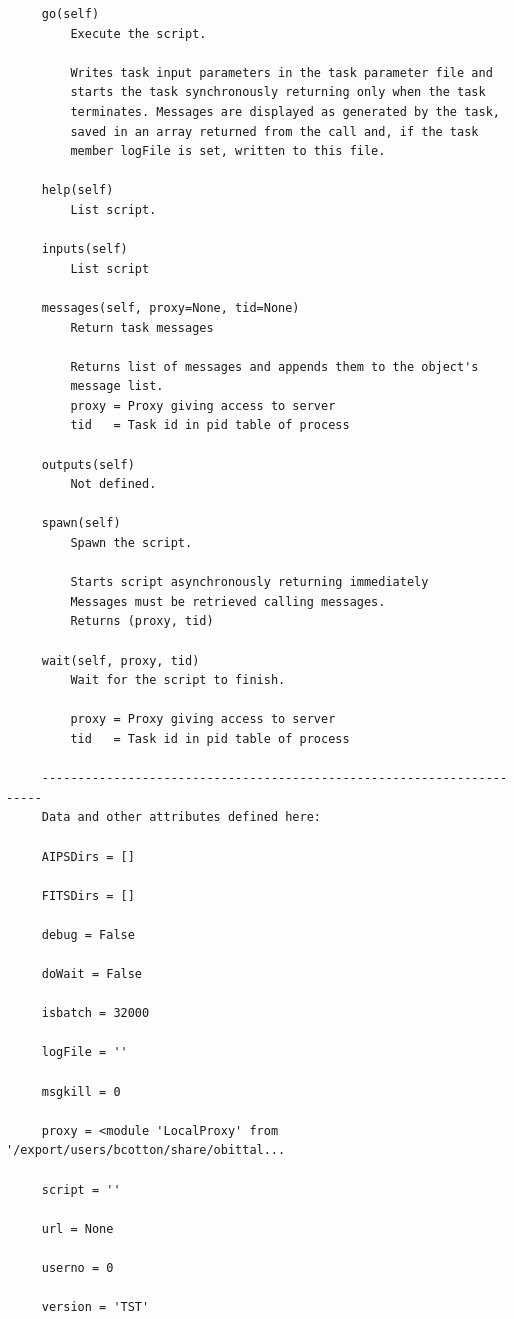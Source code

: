 \documentclass[11pt]{report}
\begin{document}
\begin{verbatim}
     go(self)
         Execute the script.
         
         Writes task input parameters in the task parameter file and
         starts the task synchronously returning only when the task
         terminates. Messages are displayed as generated by the task,
         saved in an array returned from the call and, if the task
         member logFile is set, written to this file.
     
     help(self)
         List script.
     
     inputs(self)
         List script
     
     messages(self, proxy=None, tid=None)
         Return task messages
         
         Returns list of messages and appends them to the object's
         message list.        
         proxy = Proxy giving access to server
         tid   = Task id in pid table of process
     
     outputs(self)
         Not defined.
     
     spawn(self)
         Spawn the script.
          
         Starts script asynchronously returning immediately
         Messages must be retrieved calling messages.
         Returns (proxy, tid)
     
     wait(self, proxy, tid)
         Wait for the script to finish.
         
         proxy = Proxy giving access to server
         tid   = Task id in pid table of process
     
     ----------------------------------------------------------------------
     Data and other attributes defined here:
     
     AIPSDirs = []
     
     FITSDirs = []
     
     debug = False
     
     doWait = False
     
     isbatch = 32000
     
     logFile = ''
     
     msgkill = 0
     
     proxy = <module 'LocalProxy' from '/export/users/bcotton/share/obittal...
     
     script = ''
     
     url = None
     
     userno = 0
     
     version = 'TST'
     

\end{verbatim}
\end{document}
